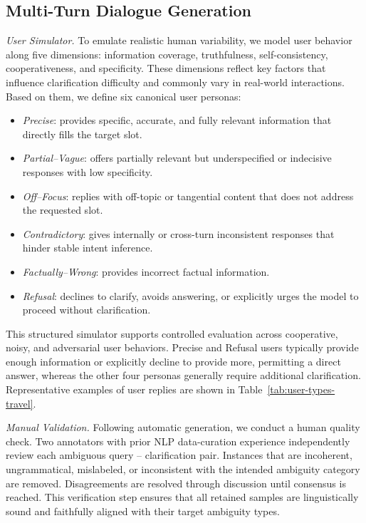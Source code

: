 \documentclass[sigconf]{acmart}
\begin{document}
\subsection{Multi-Turn Dialogue Generation}

\textit{User Simulator.}
To emulate realistic human variability, we model user behavior along five dimensions: information coverage, truthfulness,
self-consistency, cooperativeness, and specificity.
These dimensions reflect key factors that influence clarification difficulty and commonly vary in real-world interactions.  
Based on them, we define six canonical user personas:

\begin{itemize}[leftmargin=1.2em]
    \item \textit{Precise}: provides specific, accurate, and fully relevant information that directly fills the target slot.
    \item \textit{Partial–Vague}: offers partially relevant but underspecified or indecisive responses with low specificity.
    \item \textit{Off–Focus}: replies with off-topic or tangential content that does not address the requested slot.
    \item \textit{Contradictory}: gives internally or cross-turn inconsistent responses that hinder stable intent inference.
    \item \textit{Factually–Wrong}: provides incorrect factual information. 
    \item \textit{Refusal}: declines to clarify, avoids answering, or explicitly urges the model to proceed without clarification.
\end{itemize}

This structured simulator supports controlled evaluation across cooperative, noisy, and adversarial user behaviors.  
{Precise} and {Refusal} users typically provide enough information or explicitly decline to provide more, permitting a direct answer, whereas the other four personas generally require additional clarification.
Representative examples of user replies are shown in Table~\ref{tab:user-types-travel}.

\textit{Manual Validation.}
Following automatic generation, we conduct a human quality check.  
Two annotators with prior NLP data-curation experience independently review each ambiguous query – clarification pair.  
Instances that are incoherent, ungrammatical, mislabeled, or inconsistent with the intended ambiguity category are removed.  
Disagreements are resolved through discussion until consensus is reached.  
This verification step ensures that all retained samples are linguistically sound and faithfully aligned with their target ambiguity types.
\end{document}
